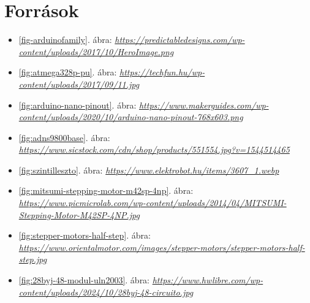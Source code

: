 \documentclass[]{thesis-ekf}
\theoremstyle{definition}
\theoremstyle{remark}
\begin{document}
\chapter*{Források}
\begin{itemize}
	\item \ref{fig-arduinofamily}. ábra: \emph{\url{https://predictabledesigns.com/wp-content/uploads/2017/10/HeroImage.png}}
	\item \ref{fig:atmega328p-pu}. ábra: \emph{\url{https://techfun.hu/wp-content/uploads/2017/09/11.jpg}}
	\item \ref{fig:arduino-nano-pinout}. ábra: \emph{\url{https://www.makerguides.com/wp-content/uploads/2020/10/arduino-nano-pinout-768x603.png}}
	\item \ref{fig:adns9800base}. ábra: \emph{\url{https://www.sicstock.com/cdn/shop/products/551554.jpg?v=1544514465}}
	\item \ref{fig:szintilleszto}. ábra: \emph{\url{https://www.elektrobot.hu/items/3607_1.webp}}
	\item \ref{fig:mitsumi-stepping-motor-m42sp-4np}. ábra: \emph{\url{https://www.picmicrolab.com/wp-content/uploads/2014/04/MITSUMI-Stepping-Motor-M42SP-4NP.jpg}}
	\item \ref{fig:stepper-motors-half-step}. ábra: \emph{\url{https://www.orientalmotor.com/images/stepper-motors/stepper-motors-half-step.jpg}}
	\item \ref{fig:28byj-48-modul-uln2003}. ábra: \emph{\url{https://www.hwlibre.com/wp-content/uploads/2024/10/28byj-48-circuito.jpg}}
\end{itemize}
\end{document}
